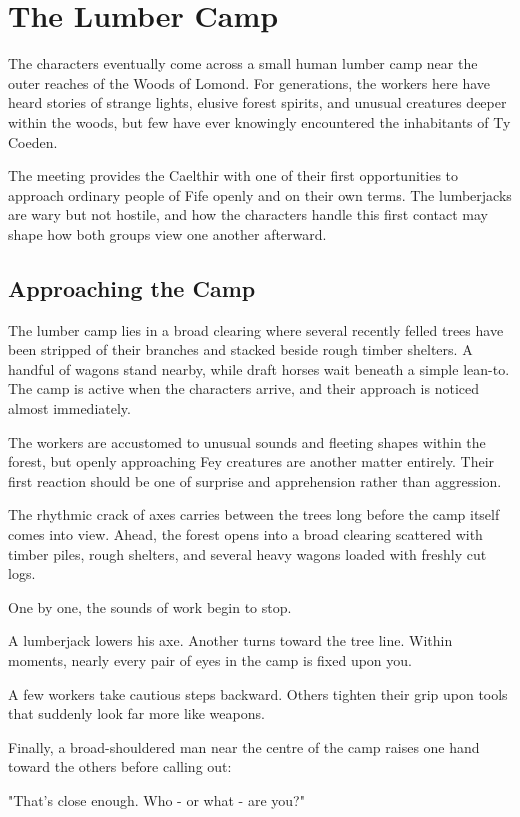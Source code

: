 \section*{The Lumber Camp}
{\entryfont The characters eventually come across a small human lumber camp near the outer reaches of the Woods of Lomond. For generations, the workers here have heard stories of strange lights, elusive forest spirits, and unusual creatures deeper within the woods, but few have ever knowingly encountered the inhabitants of Ty Coeden.

The meeting provides the Caelthir with one of their first opportunities to approach ordinary people of Fife openly and on their own terms. The lumberjacks are wary but not hostile, and how the characters handle this first contact may shape how both groups view one another afterward.}
\subsection*{Approaching the Camp}
{\entryfont The lumber camp lies in a broad clearing where several recently felled trees have been stripped of their branches and stacked beside rough timber shelters. A handful of wagons stand nearby, while draft horses wait beneath a simple lean-to. The camp is active when the characters arrive, and their approach is noticed almost immediately.

The workers are accustomed to unusual sounds and fleeting shapes within the forest, but openly approaching Fey creatures are another matter entirely. Their first reaction should be one of surprise and apprehension rather than aggression.}
\begin{DndReadAloud}
	The rhythmic crack of axes carries between the trees long before the camp itself comes into view. Ahead, the forest opens into a broad clearing scattered with timber piles, rough shelters, and several heavy wagons loaded with freshly cut logs.

	One by one, the sounds of work begin to stop.

	A lumberjack lowers his axe. Another turns toward the tree line. Within moments, nearly every pair of eyes in the camp is fixed upon you.

	A few workers take cautious steps backward. Others tighten their grip upon tools that suddenly look far more like weapons.

	Finally, a broad-shouldered man near the centre of the camp raises one hand toward the others before calling out:

	"That's close enough. Who - or what - are you?"
\end{DndReadAloud}
